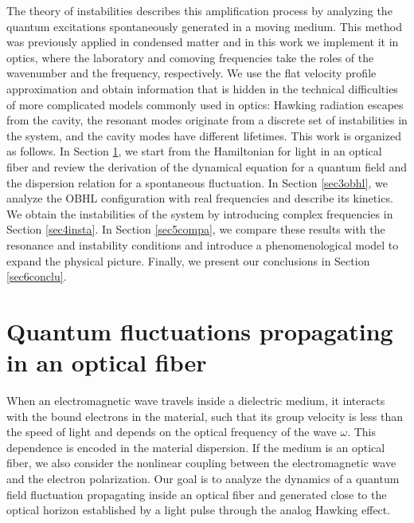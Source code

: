 \documentclass[aps,pra,reprint,amsmath,amssymb,showpacs,groupedaddress,floatfix]{revtex4-1}
\begin{document}
The theory of instabilities describes this amplification process \cite{Leonhardt2003, Hydrodynamic} by analyzing the quantum excitations spontaneously generated in a moving medium. This method was previously applied in condensed matter \cite{Macher2009pra,2018Bermudez,Finazzi2010njp,Coutant2010} and in this work we implement it in optics, where the laboratory and comoving frequencies take the roles of the wavenumber and the frequency, respectively. We use the flat velocity profile approximation and obtain information that is hidden in the technical difficulties of more complicated models commonly used in optics: Hawking radiation escapes from the cavity, the resonant modes originate from a discrete set of instabilities in the system, and the cavity modes have different lifetimes.
This work is organized as follows. In Section \ref{sec2model}, we start from the Hamiltonian for light in an optical fiber and review the derivation of the dynamical equation for a quantum field and the dispersion relation for a spontaneous fluctuation. In Section \ref{sec3obhl}, we analyze the OBHL configuration with real frequencies and describe its kinetics. We obtain the instabilities of the system by introducing complex frequencies in Section \ref{sec4insta}. In Section \ref{sec5compa}, we compare these results with the resonance and instability conditions and introduce a phenomenological model to expand the physical picture. Finally, we present our conclusions in Section \ref{sec6conclu}.

\section{Quantum fluctuations propagating in an optical fiber}\label{sec2model}
When an electromagnetic wave travels inside a dielectric medium, it interacts with the bound electrons in the material, such that its group velocity is less than the speed of light and depends on the optical frequency of the wave $\omega$. This dependence is encoded in the material dispersion. If the medium is an optical fiber, we also consider the nonlinear coupling between the electromagnetic wave and the electron polarization. Our goal is to analyze the dynamics of a quantum field fluctuation propagating inside an optical fiber and generated close to the optical horizon established by a light pulse through the analog Hawking effect.
\end{document}
